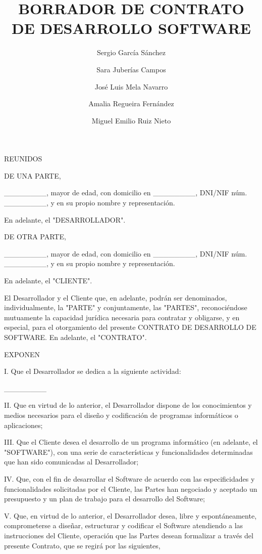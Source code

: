 \documentclass[a4paper,11pt]{report}
\begin{document}
	\title{BORRADOR DE CONTRATO DE DESARROLLO SOFTWARE}
	\author{
		Sergio García Sánchez
		\and
		Sara Juberías Campos
		\and
		José Luis Mela Navarro
		\and
		Amalia Regueira Fernández
		\and
		Miguel Emilio Ruiz Nieto
	}
	
	\maketitle
	
	REUNIDOS
	
	DE UNA PARTE,
	
	\_\_\_\_\_\_\_\_, mayor de edad, con domicilio en \_\_\_\_\_\_\_\_, DNI/NIF núm.
	\_\_\_\_\_\_\_\_, y en su propio nombre y representación.
	
	En adelante, el "DESARROLLADOR".
	
	DE OTRA PARTE,
	
	\_\_\_\_\_\_\_\_, mayor de edad, con domicilio en \_\_\_\_\_\_\_\_, DNI/NIF núm.
	\_\_\_\_\_\_\_\_, y en su propio nombre y representación.
	
	En adelante, el "CLIENTE".
	
	El Desarrollador y el Cliente que, en adelante, podrán ser denominados,
	individualmente, la "PARTE" y conjuntamente, las "PARTES",
	reconociéndose mutuamente la capacidad jurídica necesaria para contratar
	y obligarse, y en especial, para el otorgamiento del presente CONTRATO
	DE DESARROLLO DE SOFTWARE. En adelante, el "CONTRATO".
	
	EXPONEN
	
	I. Que el Desarrollador se dedica a la siguiente actividad:
	
	\_\_\_\_\_\_\_\_
	
	II. Que en virtud de lo anterior, el Desarrollador dispone de los
	conocimientos y medios necesarios para el diseño y codificación de
	programas informáticos o aplicaciones;
	
	III. Que el Cliente desea el desarrollo de un programa informático (en
	adelante, el "SOFTWARE"), con una serie de características y
	funcionalidades determinadas que han sido comunicadas al Desarrollador;
	
	IV. Que, con el fin de desarrollar el Software de acuerdo con las
	especificidades y funcionalidades solicitadas por el Cliente, las Partes
	han negociado y aceptado un presupuesto y un plan de trabajo para el
	desarrollo del Software;
	
	V. Que, en virtud de lo anterior, el Desarrollador desea, libre y
	espontáneamente, comprometerse a diseñar, estructurar y codificar el
	Software atendiendo a las instrucciones del Cliente, operación que las
	Partes desean formalizar a través del presente Contrato, que se regirá
	por las siguientes,
	
\end{document}
